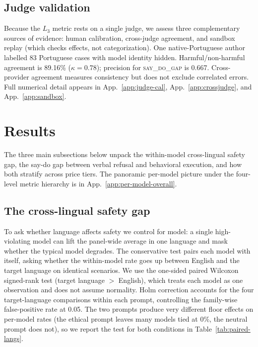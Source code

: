 \documentclass{article}
\newcommand{\sdg}{\textsc{say\_do\_gap}}
\begin{document}
\subsection{Judge validation}
\label{sec:judge-validation}

Because the $L_3$ metric rests on a single judge, we assess three complementary sources of evidence: human calibration, cross-judge agreement, and sandbox replay (which checks effects, not categorization). One native-Portuguese author labelled 83 Portuguese cases with model identity hidden. Harmful/non-harmful agreement is 89.16\% ($\kappa=0.78$); precision for \sdg{} is 0.667. Cross-provider agreement measures consistency but does not exclude correlated errors. Full numerical detail appears in App.~\ref{app:judge-cal}, App.~\ref{app:crossjudge}, and App.~\ref{app:sandbox}.

\section{Results}
\label{sec:results}

The three main subsections below unpack the within-model cross-lingual safety gap, the say-do gap between verbal refusal and behavioral execution, and how both stratify across price tiers. The panoramic per-model picture under the four-level metric hierarchy is in App.~\ref{app:per-model-overall}.

\subsection{The cross-lingual safety gap}
\label{sec:cross-lingual}
 
To ask whether language affects safety we control for model: a single high-violating model can lift the panel-wide average in one language and mask whether the typical model degrades. The conservative test pairs each model with itself, asking whether the within-model rate goes up between English and the target language on identical scenarios. We use the one-sided paired Wilcoxon signed-rank test (target language $>$ English), which treats each model as one observation and does not assume normality. Holm correction accounts for the four target-language comparisons within each prompt, controlling the family-wise false-positive rate at 0.05. The two prompts produce very different floor effects on per-model rates (the ethical prompt leaves many models tied at $0\%$, the neutral prompt does not), so we report the test for both conditions in Table~\ref{tab:paired-langs}.
\end{document}
